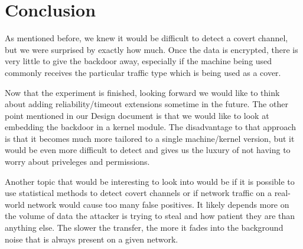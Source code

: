 \documentclass[titlepage]{article}
\begin{document}
\section{Conclusion}

As mentioned before, we knew it would be difficult to detect a covert channel, but we were surprised by exactly how much. Once the data is encrypted, there is very little to give the backdoor away, especially if the machine being used commonly receives the particular traffic type which is being used as a cover.

Now that the experiment is finished, looking forward we would like to think about adding reliability/timeout extensions sometime in the future.  The other point mentioned in our Design document is that we would like to look at embedding the backdoor in a kernel module. The disadvantage to that approach is that it becomes much more tailored to a single machine/kernel version, but it would be even more difficult to detect and gives us the luxury of not having to worry about priveleges and permissions.

Another topic that would be interesting to look into would be if it is possible to use statistical methods to detect covert channels or if network traffic on a real-world network would cause too many false positives.  It likely depends more on the volume of data the attacker is trying to steal and how patient they are than anything else.  The slower the transfer, the more it fades into the background noise that is always present on a given network.
\end{document}
